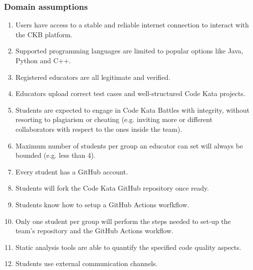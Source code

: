 \subsubsection{Domain assumptions}
\begin{enumerate}[label=$\bullet$ \textbf{D\arabic*:}]
    \item Users have access to a stable and reliable internet connection to interact with the CKB platform.
    \item Supported programming languages are limited to popular options like Java, Python and C++.
    \item Registered educators are all legitimate and verified.
    \item Educators upload correct test cases and well-structured Code Kata projects.
    \item Students are expected to engage in Code Kata Battles with integrity, without resorting to plagiarism or cheating (e.g. inviting more or different collaborators with respect to the ones inside the team).
    \item Maximum number of students per group an educator can set will always be bounded (e.g. less than 4).
    \item Every student has a GitHub account.
    \item Students will fork the Code Kata GitHub repository once ready.
    \item Students know how to setup a GitHub Actions worfkflow.
    \item Only one student per group will perform the steps needed to set-up the team's repository and the GitHub Actions workflow.
    \item Static analysis tools are able to quantify the specified code quality aspects.
    \item Students use external communication channels.
\end{enumerate}
